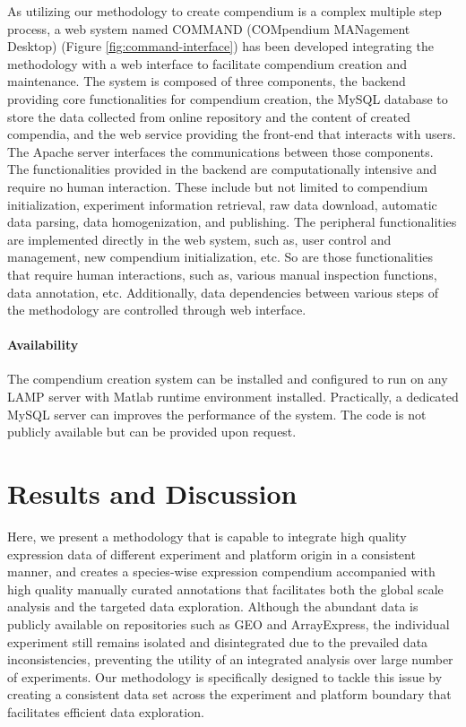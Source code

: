 As utilizing our methodology to create compendium is a complex multiple step process, a web system named COMMAND (COMpendium MANagement Desktop) (Figure  \ref{fig:command-interface}) has been developed integrating the methodology  with a web interface to facilitate compendium creation and maintenance. The system is composed of three components, the backend providing core functionalities for compendium creation, the MySQL database to store the data collected from online repository and the content of created compendia, and the web service providing the front-end that interacts with users.  The Apache server interfaces the communications between those components. The functionalities provided in the backend are computationally intensive and require no human interaction.  These include but not limited to compendium initialization, experiment information retrieval, raw data download, automatic data parsing, data homogenization, and publishing. The peripheral functionalities are implemented directly in the web system, such as, user control and management, new compendium initialization, etc.  So are those functionalities that require human interactions, such as, various manual inspection functions, data annotation, etc.  Additionally, data dependencies between various steps of the methodology are controlled through web interface. 

\paragraph{Availability} 
The compendium creation system can be installed and configured to run on any LAMP server with Matlab runtime environment installed.  Practically, a dedicated MySQL server can improves the performance of the system. The code is not publicly available but can be provided upon request.
  




\section{Results and Discussion}
 
Here, we present a methodology that is capable to integrate high quality expression data of different experiment and platform origin in a consistent manner, and creates a species-wise expression compendium accompanied with high quality manually curated annotations that facilitates both the global scale analysis and the targeted data exploration. Although the abundant data is publicly available on repositories such as GEO and ArrayExpress, the individual experiment still remains isolated and disintegrated due to the prevailed data inconsistencies, preventing the utility of an integrated analysis over large number of experiments. Our methodology is specifically designed to tackle this issue by creating a consistent data set across the experiment and platform boundary that facilitates efficient data exploration. 

